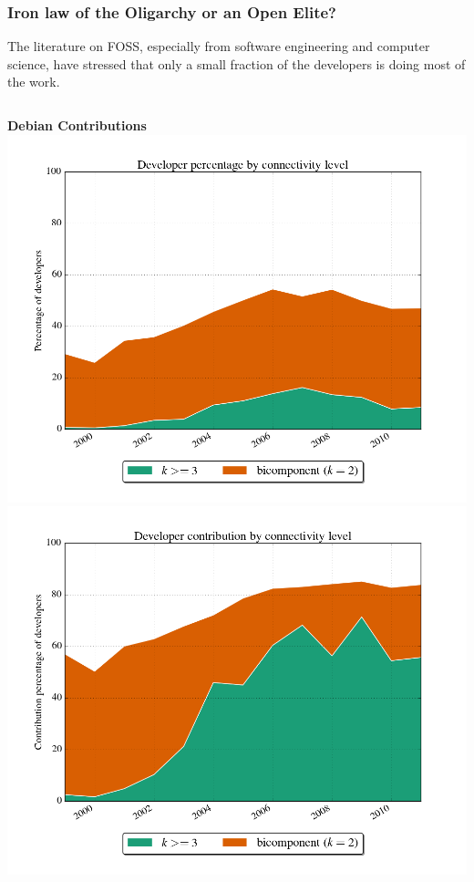 \documentclass[ignorenonframetext,red,8pt]{beamer}
\begin{document}
\begin{frame}
\frametitle{Iron law of the Oligarchy or an Open Elite?}

The literature on FOSS, especially from software engineering and computer science, have stressed that only a small fraction of the developers is doing most of the work.

\begin{columns}[c]
\begin{column}{0.5\textwidth}
\begin{center}
\textbf{Debian Contributions}
\includegraphics[scale=0.16]{../../figures/evolution_developers_debian_years}
\newline
\includegraphics[scale=0.16]{../../figures/evolution_connectivity_debian_years}
\end{center}
\end{column}


\end{columns}
\end{frame}
\end{document}
